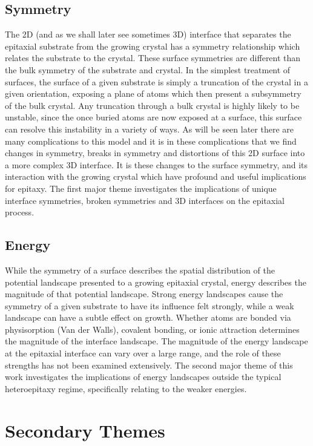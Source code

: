 \subsection{Symmetry} The 2D (and as we shall later see sometimes 3D) interface that separates the epitaxial substrate from the growing crystal has a symmetry relationship which relates the substrate to the crystal.
These surface symmetries are different than the bulk symmetry of the substrate and crystal.
In the simplest treatment of surfaces, the surface of a given substrate is simply a truncation of the crystal in a given orientation, exposing a plane of atoms which then present a subsymmetry of the bulk crystal.
Any truncation through a bulk crystal is highly likely to be unstable, since the once buried atoms are now exposed at a surface, this surface can resolve this instability in a variety of ways.
As will be seen later there are many complications to this model and it is in these complications that we find changes in symmetry, breaks in symmetry and distortions of this 2D surface into a more complex 3D interface.
It is these changes to the surface symmetry, and its interaction with the growing crystal which have profound and useful implications for epitaxy.
The first major theme investigates the implications of unique interface symmetries, broken symmetries and 3D interfaces on the epitaxial process.

\subsection{Energy}
While the symmetry of a surface describes the spatial distribution of the potential landscape presented to a growing epitaxial crystal, energy describes the magnitude of that potential landscape.
Strong energy landscapes cause the symmetry of a given substrate to have its influence felt strongly, while a weak landscape can have a subtle effect on growth.
Whether atoms are bonded via physisorption (Van der Walls), covalent bonding, or ionic attraction determines the magnitude of the interface landscape.
The magnitude of the energy landscape at the epitaxial interface can vary over a large range, and the role of these strengths has not been examined extensively.
The second major theme of this work investigates the implications of energy landscapes outside the typical heteroepitaxy regime, specifically relating to the weaker energies.

\section{Secondary Themes}

